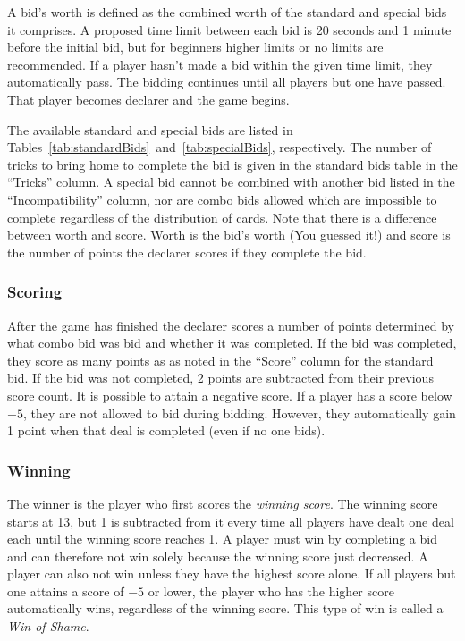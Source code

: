 \documentclass[a4paper]{article}
\begin{document}
				A bid's worth is defined as the combined worth of the standard and special bids it comprises. A proposed time limit between each bid is 20 seconds and 1 minute before the initial bid, but for beginners higher limits or no limits are recommended. If a player hasn't made a bid within the given time limit, they automatically pass. The bidding continues until all players but one have passed. That player becomes declarer and the game begins.

				The available standard and special bids are listed in Tables~\ref{tab:standardBids}~and~\ref{tab:specialBids}, respectively. The number of tricks to bring home to complete the bid is given in the standard bids table in the ``Tricks'' column. A special bid cannot be combined with another bid listed in the ``Incompatibility'' column, nor are combo bids allowed which are impossible to complete regardless of the distribution of cards. Note that there is a difference between worth and score. Worth is the bid's worth (You guessed it!) and score is the number of points the declarer scores if they complete the bid.
			

			\subsubsection{Scoring}
				After the game has finished the declarer scores a number of points determined by what combo bid was bid and whether it was completed. If the bid was completed, they score as many points as as noted in the ``Score'' column for the standard bid. If the bid was not completed, 2 points are subtracted from their previous score count. It is possible to attain a negative score. If a player has a score below $-5$, they are not allowed to bid during bidding. However, they automatically gain 1 point when that deal is completed (even if no one bids).

			\subsubsection{Winning}
				\label{sec:winning}
				The winner is the player who first scores the \emph{winning score}. The winning score starts at 13, but 1 is subtracted from it every time all players have dealt one deal each until the winning score reaches 1. A player must win by completing a bid and can therefore not win solely because the winning score just decreased. A player can also not win unless they have the highest score alone. If all players but one attains a score of $-5$ or lower, the player who has the higher score automatically wins, regardless of the winning score. This type of win is called a \emph{Win of Shame}.
\end{document}
